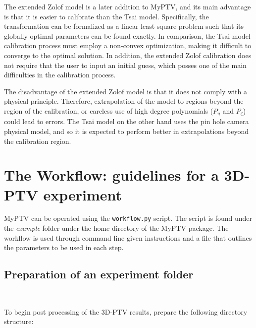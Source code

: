 \documentclass[10pt,a4paper]{article}
\begin{document}
The extended Zolof model is a later addition to MyPTV, and its main advantage is that it is easier to calibrate than the Tsai model. Specifically, the transformation can be formalized as a linear least square problem such that its globally optimal parameters can be found exactly. In comparison, the Tsai model calibration process must employ a non-convex optimization, making it difficult to converge to the optimal solution. In addition, the extended Zolof calibration does not require that the user to input an initial guess, which posses one of the main difficulties in the calibration process. 


The disadvantage of the extended Zolof model is that it does not comply with a physical principle. Therefore, extrapolation of the model to regions beyond the region of the calibration, or careless use of high degree polynomials ($P_\eta$ and $P_\zeta$) could lead to errors. The Tsai model on the other hand uses the pin hole camera physical model, and so it is expected to perform better in extrapolations beyond the calibration region.



















\clearpage



\section{The Workflow: guidelines for a 3D-PTV experiment}\label{sec:workflow}


MyPTV can be operated using the \texttt{workflow.py} script. The script is found under the \textit{example} folder under the home directory of the MyPTV package. The workflow is used through command line given instructions and a file that outlines the parameters to be used in each step.





\subsection{Preparation of an experiment folder}~\label{sec:workflow_exp_folder}

To begin post processing of the 3D-PTV results, prepare the following directory structure:
\end{document}
